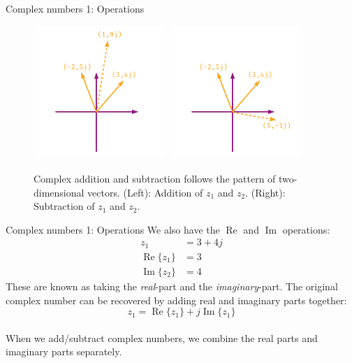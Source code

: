 \documentclass{beamer}
\begin{document}
\begin{frame}{Complex numbers 1: Operations}
\begin{figure}
\centering
\includegraphics[width=0.45\textwidth]{figures/complexNumbers1.pdf}
\includegraphics[width=0.45\textwidth]{figures/complexNumbers2.pdf}
\caption{\label{fig:complex1} Complex addition and subtraction follows the pattern of two-dimensional vectors. (Left): Addition of $z_1$ and $z_2$.  (Right): Subtraction of $z_1$ and $z_2$.}
\end{figure}
\end{frame}

\begin{frame}{Complex numbers 1: Operations}
We also have the $\operatorname{Re}$ and $\operatorname{Im}$ operations:
\begin{align}
z_1 &= 3+4j \\
\operatorname{Re}\lbrace z_1 \rbrace &= 3 \\
\operatorname{Im}\lbrace z_2 \rbrace &= 4
\end{align}
These are known as taking the \textit{real}-part and the \textit{imaginary}-part.  The original complex number can be recovered by adding real and imaginary parts together:
\begin{equation}
z_1 = \operatorname{Re}\lbrace z_1 \rbrace + j \operatorname{Im}\lbrace z_1 \rbrace
\end{equation} \\
When we add/subtract complex numbers, we combine the real parts and imaginary parts separately.
\end{frame}
\end{document}
